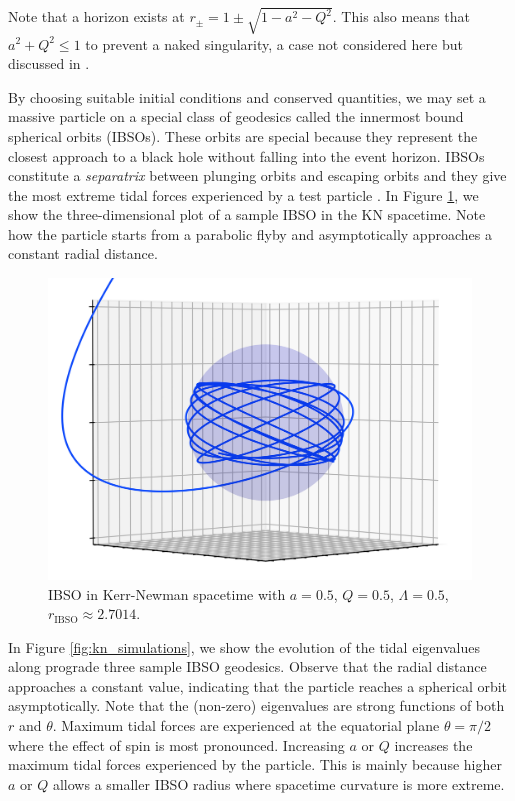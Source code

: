 \documentclass[11pt, twocolumn]{article}
\begin{document}
Note that a horizon exists at $r_{\pm} = 1 \pm \sqrt{1 - a^{2} - Q^{2}}$. This also means that $a^{2} + Q^{2} \leq 1$ to prevent a naked singularity, a case not considered here but discussed in \cite{Anonymous2024}.

By choosing suitable initial conditions and conserved quantities, we may set a massive particle on a special class of geodesics called the innermost bound spherical orbits (IBSOs). These orbits are special because they represent the closest approach to a black hole without falling into the event horizon. IBSOs constitute a \textit{separatrix} between plunging orbits and escaping orbits and they give the most extreme tidal forces experienced by a test particle \cite{Mummery2023}. In Figure \ref{fig:ibso}, we show the three-dimensional plot of a sample IBSO in the KN spacetime. Note how the particle starts from a parabolic flyby and asymptotically approaches a constant radial distance.

\begin{figure}[ht!]
    \centering
    \includegraphics[width=\columnwidth]{asset/IBSO_3D_a_0.50_Q_0.50_lambda_0.50.png}
    \caption{IBSO in Kerr-Newman spacetime with $a = 0.5$, $Q = 0.5$, $\Lambda = 0.5$, $r_{\text{IBSO}} \approx 2.7014$.}
    \label{fig:ibso}
\end{figure}

In Figure \ref{fig:kn_simulations}, we show the evolution of the tidal eigenvalues along prograde three sample IBSO geodesics. Observe that the radial distance approaches a constant value, indicating that the particle reaches a spherical orbit asymptotically. Note that the (non-zero) eigenvalues are strong functions of both $r$ and $\theta$. Maximum tidal forces are experienced at the equatorial plane $\theta = \pi/2$ where the effect of spin is most pronounced. Increasing $a$ or $Q$ increases the maximum tidal forces experienced by the particle. This is mainly because higher $a$ or $Q$ allows a smaller IBSO radius where spacetime curvature is more extreme.
\end{document}

